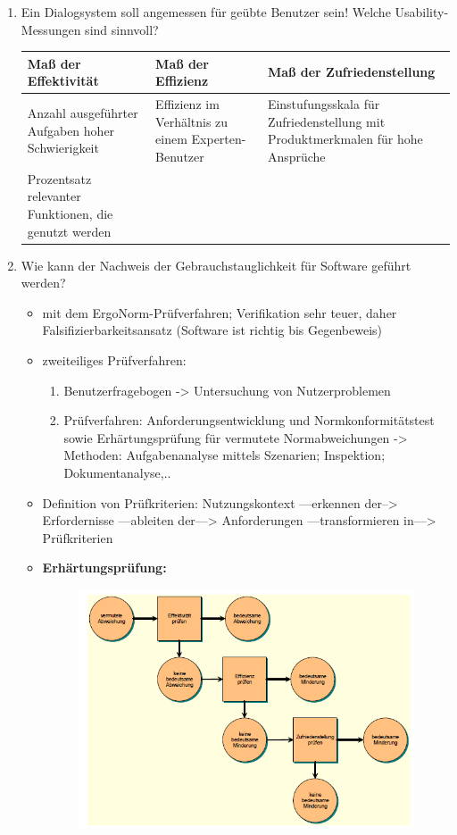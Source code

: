 \begin{enumerate}
	\item Ein Dialogsystem soll angemessen für geübte Benutzer sein! Welche Usability-
	Messungen sind sinnvoll?
		\begin{table}[!h]
			\centering
			\begin{tabular}{|p{13em}|p{13em}|p{13em}|}
				\hline
				\textbf{Maß der Effektivität} & \textbf{Maß der Effizienz} & \textbf{Maß der Zufriedenstellung}\\
				\hline
				Anzahl ausgeführter Aufgaben hoher Schwierigkeit & Effizienz im Verhältnis zu einem Experten-Benutzer & Einstufungsskala für Zufriedenstellung mit Produktmerkmalen für hohe Ansprüche\\
				\hline
				Prozentsatz relevanter Funktionen, die genutzt werden&&\\
				\hline
			\end{tabular}
		\end{table}
	\item Wie kann der Nachweis der Gebrauchstauglichkeit für Software geführt werden?
	\begin{itemize}
		\item 	mit dem ErgoNorm-Prüfverfahren; Verifikation sehr teuer, daher Falsifizierbarkeitsansatz (Software ist richtig bis Gegenbeweis)
		\item zweiteiliges Prüfverfahren:
		\begin{enumerate}
			\item Benutzerfragebogen -> Untersuchung von Nutzerproblemen
			\item Prüfverfahren: Anforderungsentwicklung und Normkonformitätstest sowie Erhärtungsprüfung für vermutete Normabweichungen -> Methoden: Aufgabenanalyse mittels Szenarien; Inspektion; Dokumentanalyse,..
		\end{enumerate}
		\item Definition von Prüfkriterien: Nutzungskontext ---erkennen der--> Erfordernisse ---ableiten der---> Anforderungen ---transformieren in---> Prüfkriterien
		\newpage
		\item \textbf{Erhärtungsprüfung:}
		\begin{figure}[!h]
			\centering
			\includegraphics[scale=0.5]{img/erhaertungspruefung.png}

\end{figure}
\end{itemize}
\end{enumerate}
